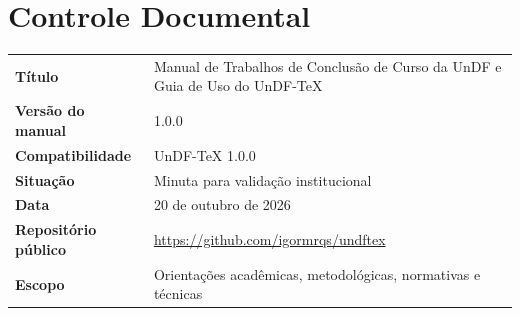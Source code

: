 \documentclass[12pt,a4paper,oneside]{report}
\begin{document}
\chapter*{Controle Documental}

\noindent\begin{tabularx}{\textwidth}{@{}>{\bfseries}p{}Y@{}}
\toprule
Título & Manual de Trabalhos de Conclusão de Curso da UnDF e Guia de Uso do UnDF-TeX \\
Versão do manual & 1.0.0 \\
Compatibilidade & UnDF-TeX 1.0.0 \\
Situação & Minuta para validação institucional \\
Data & 20 de outubro de 2026 \\
Repositório público & \url{https://github.com/igormrqs/undftex} \\
Escopo & Orientações acadêmicas, metodológicas, normativas e técnicas \\
\bottomrule
\end{tabularx}
\end{document}
